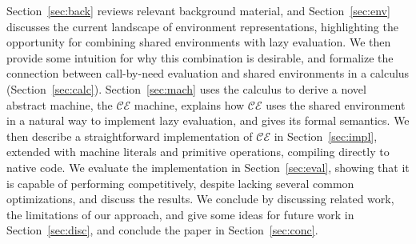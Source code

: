 Section~\ref{sec:back} reviews relevant background material, and
Section~\ref{sec:env} discusses the current landscape of environment
representations, highlighting the opportunity for combining shared environments
with lazy evaluation.  We then provide some intuition for why this combination
is desirable, and formalize the connection between call-by-need evaluation and
shared environments in a calculus (Section~\ref{sec:calc}).
Section~\ref{sec:mach} uses the calculus to derive a novel abstract machine, the
$\mathcal{CE}$ machine, explains how $\mathcal{CE}$ uses the shared environment
in a natural way to implement lazy evaluation, and gives its formal semantics.
We then describe a straightforward implementation of $\mathcal{CE}$ in
Section~\ref{sec:impl}, extended with machine literals and primitive operations,
compiling directly to native code. We evaluate the implementation in
Section~\ref{sec:eval}, showing that it is capable of performing competitively,
despite lacking several common optimizations, and discuss the results. We
conclude by discussing related work, the limitations of our approach, and give
some ideas for future work in Section~\ref{sec:disc}, and conclude the paper in
Section~\ref{sec:conc}.


